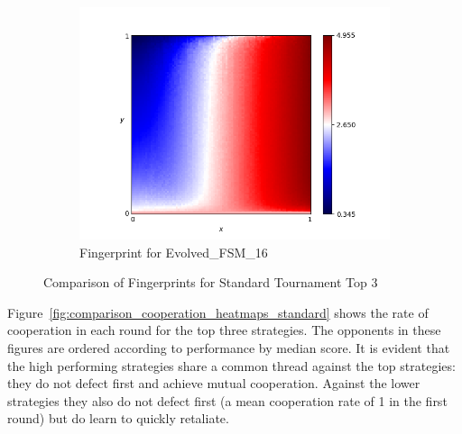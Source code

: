 \documentclass{article}
\begin{document}
\begin{figure}[!hbtp]
\begin{subfigure}[t]{.3\textwidth}
        \centering
        \includegraphics[width=\textwidth]{./assets/Evolved_FSM_16.png}
        \caption{Fingerprint for Evolved\_FSM\_16}
    \end{subfigure}%

    \caption{Comparison of Fingerprints for Standard Tournament Top 3}
    \label{fig:comparison_fingerprint_standard}
\end{figure}

Figure~\ref{fig:comparison_cooperation_heatmaps_standard} shows the rate of
cooperation in each round for the top three strategies. The opponents in these
figures are ordered according to performance by median score. It is evident that
the high performing strategies share a common thread against the top strategies:
they do not defect first and achieve mutual cooperation. Against the lower
strategies they also do not defect first (a mean cooperation rate of 1 in the
first round) but do learn to quickly retaliate.
\end{document}
